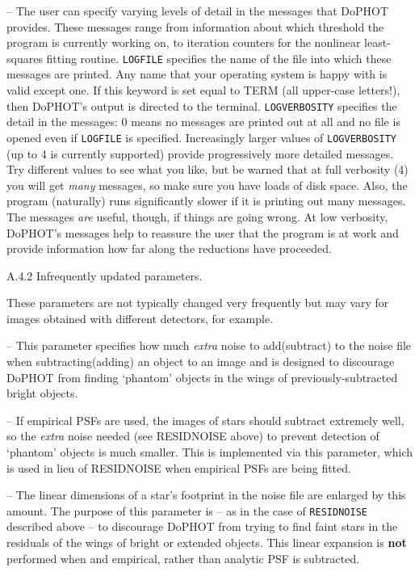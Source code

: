  -- The user can specify
varying levels of detail in the messages that 
DoPHOT provides.  These messages range from information about
which threshold the program is currently working on, to 
iteration counters for the nonlinear least-squares fitting routine.
{\tt LOGFILE} specifies the name of the file into which these
messages are printed.  Any name that your operating system is
happy with is valid except one.  If this keyword is set 
equal to  TERM (all upper-case letters!), then DoPHOT's output
is directed to the terminal.  {\tt LOGVERBOSITY} specifies the
detail in the messages:  0 means no messages are printed out at
all and no file is opened even if {\tt LOGFILE} is specified.
Increasingly larger values of {\tt LOGVERBOSITY} (up to 4 is 
currently supported) provide progressively
more detailed messages.  Try different values to see what you 
like, but be warned that at full verbosity (4) 
you will get {\it many} messages, so
make sure you have loads of disk space.  Also, the program
(naturally) runs significantly slower if it is printing out
many messages.  The messages {\it are} useful, though, if 
things are going wrong. At low verbosity, DoPHOT's messages
help to reassure the user that the program is at work and provide
information how far along the reductions have proceeded.

\centerline{A.4.2  Infrequently updated parameters.}

These parameters are not typically changed very frequently
but may vary for images obtained with different 
detectors, for example.

 -- This parameter specifies how
much {\it extra} noise to add(subtract) to the noise file when
subtracting(adding) an object to an image and is 
designed to discourage DoPHOT from finding `phantom' objects
in the wings of previously-subtracted bright objects.

 -- If empirical PSFs are used, 
the images of stars should subtract extremely well, so the 
{\it extra} noise needed (see RESIDNOISE above) to prevent 
detection of `phantom' objects is much smaller. This is implemented 
via this parameter, which is used in lieu of RESIDNOISE when empirical 
PSFs are being fitted.

 --  The linear dimensions of a
star's footprint in the
noise file are enlarged by this amount.  The purpose of this
parameter is -- as in the case of {\tt RESIDNOISE} described
above -- to discourage DoPHOT from trying to find faint stars
in the residuals of the wings of bright or extended objects.
This linear expansion is {\bf not} performed when and empirical,
rather than analytic PSF is subtracted.


